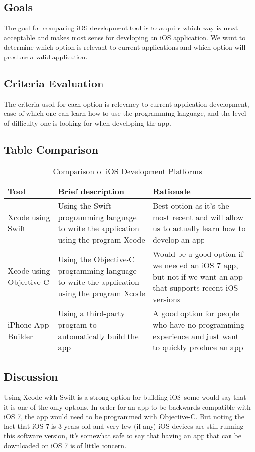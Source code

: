 \documentclass[letterpaper,10pt,draftclsnofoot,onecolumn,titlepage]{IEEEtran}
\begin{document}
	\subsection{Goals}
	The goal for comparing iOS development tool is to acquire which way is most acceptable and makes most sense for developing an iOS application. 
	We want to determine which option is relevant to current applications and which option will produce a valid application. 
	\subsection{Criteria Evaluation}
	The criteria used for each option is relevancy to current application development, ease of which one can learn how to use the programming language, and the level of difficulty one is looking for when developing the app.
	\subsection{Table Comparison}
	
	\begin{table}[ht]
	\caption{Comparison of iOS Development Platforms}
	\begin{center}
	\begin{tabular} { | m{3cm} | m{5cm} | m{5cm} | }
	\hline\hline
	Tool & Brief description & Rationale \\ [0.5ex]
	\hline
	Xcode using Swift & Using the Swift programming language to write the application using the program Xcode & Best option as it's the most recent and will allow us to actually learn how to develop an app \\
	\hline
	Xcode using Objective-C & Using the Objective-C programming language to write the application using the program Xcode & Would be a good option if we needed an iOS 7 app, but not if we want an app that supports recent iOS versions \\
	\hline
	iPhone App Builder & Using a third-party program to automatically build the app & A good option for people who have no programming experience and just want to quickly produce an app \\
	\hline
	\end{tabular}
	\end{center}
	\end{table}
	
	\subsection{Discussion}
	Using Xcode with Swift is a strong option for building iOS--some would say that it is one of the only options.
	In order for an app to be backwards compatible with iOS 7, the app would need to be programmed with Objective-C. 
	But noting the fact that iOS 7 is 3 years old and very few (if any) iOS devices are still running this software version, it's somewhat safe to say that having an app that can be downloaded on iOS 7 is of little concern. 
	
\end{document}
